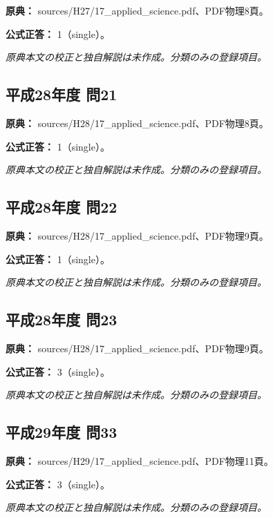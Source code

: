 \noindent\textbf{原典：} sources/H27/17\_applied\_science.pdf、PDF物理8頁。

\textbf{公式正答：} 1（single）。

\par\textit{原典本文の校正と独自解説は未作成。分類のみの登録項目。}

\subsection{平成28年度 問21}
\label{q:h28-reg-applied-21}

\noindent\textbf{原典：} sources/H28/17\_applied\_science.pdf、PDF物理8頁。

\textbf{公式正答：} 1（single）。

\par\textit{原典本文の校正と独自解説は未作成。分類のみの登録項目。}

\subsection{平成28年度 問22}
\label{q:h28-reg-applied-22}

\noindent\textbf{原典：} sources/H28/17\_applied\_science.pdf、PDF物理9頁。

\textbf{公式正答：} 1（single）。

\par\textit{原典本文の校正と独自解説は未作成。分類のみの登録項目。}

\subsection{平成28年度 問23}
\label{q:h28-reg-applied-23}

\noindent\textbf{原典：} sources/H28/17\_applied\_science.pdf、PDF物理9頁。

\textbf{公式正答：} 3（single）。

\par\textit{原典本文の校正と独自解説は未作成。分類のみの登録項目。}

\subsection{平成29年度 問33}
\label{q:h29-reg-applied-33}

\noindent\textbf{原典：} sources/H29/17\_applied\_science.pdf、PDF物理11頁。

\textbf{公式正答：} 3（single）。

\par\textit{原典本文の校正と独自解説は未作成。分類のみの登録項目。}

